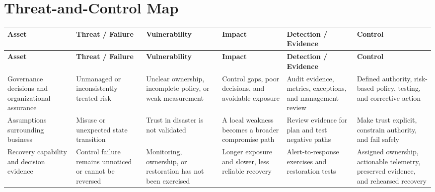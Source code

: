 \documentclass[11pt]{article}
\begin{document}
\section*{Threat-and-Control Map}
\begingroup\scriptsize\setlength{\tabcolsep}{2pt}
\begin{longtable}{>{\RaggedRight\arraybackslash}p{}>{\RaggedRight\arraybackslash}p{}>{\RaggedRight\arraybackslash}p{}>{\RaggedRight\arraybackslash}p{}>{\RaggedRight\arraybackslash}p{}>{\RaggedRight\arraybackslash}p{}}
\toprule\rowcolor{Navy}\color{white}\textbf{Asset} & \color{white}\textbf{Threat / Failure} & \color{white}\textbf{Vulnerability} & \color{white}\textbf{Impact} & \color{white}\textbf{Detection / Evidence} & \color{white}\textbf{Control}\\\midrule
\endfirsthead
\toprule\rowcolor{Navy}\color{white}\textbf{Asset} & \color{white}\textbf{Threat / Failure} & \color{white}\textbf{Vulnerability} & \color{white}\textbf{Impact} & \color{white}\textbf{Detection / Evidence} & \color{white}\textbf{Control}\\\midrule
\endhead
Governance decisions and organizational assurance & Unmanaged or inconsistently treated risk & Unclear ownership, incomplete policy, or weak measurement & Control gaps, poor decisions, and avoidable exposure & Audit evidence, metrics, exceptions, and management review & Defined authority, risk-based policy, testing, and corrective action\\\midrule
Assumptions surrounding business & Misuse or unexpected state transition & Trust in disaster is not validated & A local weakness becomes a broader compromise path & Review evidence for plan and test negative paths & Make trust explicit, constrain authority, and fail safely\\\midrule
Recovery capability and decision evidence & Control failure remains unnoticed or cannot be reversed & Monitoring, ownership, or restoration has not been exercised & Longer exposure and slower, less reliable recovery & Alert-to-response exercises and restoration tests & Assigned ownership, actionable telemetry, preserved evidence, and rehearsed recovery\\\midrule
\bottomrule
\end{longtable}
\endgroup
\end{document}
